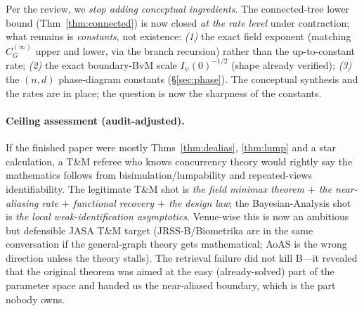 \documentclass[11pt]{article}
\begin{document}
\noindent Per the review, we \emph{stop adding conceptual ingredients}. The connected-tree lower bound
(Thm~\ref{thm:connected}) is now closed \emph{at the rate level} under contraction; what remains is
\emph{constants}, not existence: \emph{(1)} the exact field exponent (matching $C_G^{(\infty)}$ upper and lower,
via the branch recursion) rather than the up-to-constant rate; \emph{(2)} the exact boundary-BvM scale
$I_\psi(0)^{-1/2}$ (shape already verified); \emph{(3)} the $(n,d)$ phase-diagram constants (\S\ref{sec:phase}).
The conceptual synthesis and the rates are in place; the question is now the sharpness of the constants.

\paragraph{Ceiling assessment (audit-adjusted).} If the finished paper were mostly Thms~\ref{thm:dealias},
\ref{thm:lump} and a star calculation, a T\&M referee who knows concurrency theory would rightly say the
mathematics follows from bisimulation/lumpability and repeated-views identifiability. The legitimate T\&M shot is
\emph{the field minimax theorem $+$ the near-aliasing rate $+$ functional recovery $+$ the design law}; the
Bayesian-Analysis shot is \emph{the local weak-identification asymptotics}. Venue-wise this is now an ambitious
but defensible JASA T\&M target (JRSS-B/Biometrika are in the same conversation if the general-graph theory gets
mathematical; AoAS is the wrong direction unless the theory stalls). The retrieval failure did not kill B---it
revealed that the original theorem was aimed at the easy (already-solved) part of the parameter space and handed
us the near-aliased boundary, which is the part nobody owns.
\end{document}
